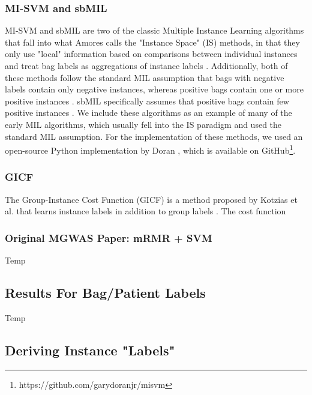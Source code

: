\subsubsection{MI-SVM and sbMIL}

MI-SVM \cite{andrews02} and sbMIL \cite{bunescu07} are two of the classic Multiple Instance Learning algorithms that fall into what Amores calls the "Instance Space" (IS) methods, in that they only use "local" information based on comparisons between individual instances and treat bag labels as aggregations of instance labels \cite{amores13}. Additionally, both of these methods follow the standard MIL assumption that bags with negative labels contain only negative instances, whereas positive bags contain one or more positive instances \cite{amores13}. sbMIL specifically assumes that positive bags contain few positive instances \cite{bunescu07}. We include these algorithms as an example of many of the early MIL algorithms, which usually fell into the IS paradigm and used the standard MIL assumption. For the implementation of these methods, we used an open-source Python implementation by Doran \cite{doran14}, which is available on GitHub\footnote{https://github.com/garydoranjr/misvm}.

\subsubsection{GICF}

The Group-Instance Cost Function (GICF) is a method proposed by Kotzias et al. that learns instance labels in addition to group labels \cite{kotzias15}. The cost function 

\subsubsection{Original MGWAS Paper: mRMR + SVM}

Temp

\subsection{Results For Bag/Patient Labels}

Temp

\subsection{Deriving Instance "Labels"}

